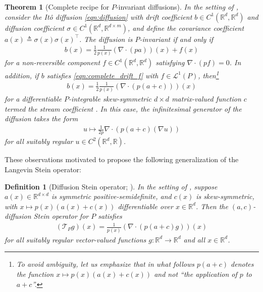 \documentclass[12pt,paper=letter]{scrreprt}
\newtheorem{theorem}{Theorem}[chapter]
\newtheorem{definition}{Definition}[chapter]
\def\Ito{It\^o\xspace}
\def\reals{\mathbb{R}} %
\def\defeq{\triangleq} %
\newcommand{\TP}{\mathcal{T}_P}
\newcommand{\Lp}[1][p]{\mathcal{L}^{#1}}
\begin{document}
\begin{theorem}[Complete recipe for $P$-invariant diffusions]
\label{thm:invariance}
In the setting of , consider the \Ito diffusion \cref{eqn:diffusion} with drift coefficient $b \in C^1(\reals^d,\reals^d)$ and diffusion coefficient $\sigma \in C^1(\reals^d,\reals^{d \times m})$, and define the \emph{covariance coefficient} $a(x) \defeq \sigma(x)\sigma(x)^\top$.
The diffusion is $P$-invariant if and only if
\begin{align}\label{eqn:complete_drift_f}
  b(x) = \frac{1}{2} \frac{1}{p(x)} (\nabla \cdot (pa))(x) + f(x) 
\end{align}
for a \emph{non-reversible component} $f \in C^1(\reals^d,\reals^d)$ satisfying $\nabla \cdot (pf) = 0$.
In addition, if $b$ satisfies \cref{eqn:complete_drift_f} with $f\in\Lp[1](P)$, then\footnote{To avoid ambiguity, let us emphasize that in what follows $p(a+c)$ denotes the function $x \mapsto p(x)(a(x) + c(x))$ and not ``the application of $p$ to $a + c$''.} 
\begin{align}
\label{eqn:drift}
  b(x) = \frac{1}{2} \frac{1}{p(x)} (\nabla \cdot (p(a+c)))(x)
\end{align}
for a differentiable $P$-integrable skew-symmetric $d\times d$ matrix-valued function $c$ termed the \emph{stream coefficient} \citep{conca2007periodic,landim1998convection}.
In this case, the infinitesimal generator of the diffusion takes the form
\begin{align*}
u \mapsto \frac{1}{2p} \nabla \cdot ( p (a+c) (\nabla u) ) 
\end{align*}
for all suitably regular $u \in C^2(\reals^d, \reals)$.
\end{theorem}

These observations motivated \citet{Gorham2019} to propose the following generalization of the Langevin Stein operator:

\begin{definition}[Diffusion Stein operator; {\citealp[(8)]{Gorham2019}}]
\label{def: diffusion operator}
In the setting of , suppose $a(x) \in \reals^{d\times d}$ is symmetric positive-semidefinite, and $c(x)$ is skew-symmetric, with $x \mapsto p(x)(a(x)+c(x))$ differentiable over $x \in \mathbb{R}^d$.
Then the \emph{$(a,c)$-diffusion Stein operator} for $P$ satisfies
\begin{align}
(\TP g)(x) = \frac{1}{p(x)} (\nabla \cdot (p(a+c)g))(x)  \label{eqn:diffusion-operator}
\end{align}
for all suitably regular vector-valued functions $g: \reals^d \to \reals^d$ and all $x \in \reals^d$.
\end{definition}
\end{document}
